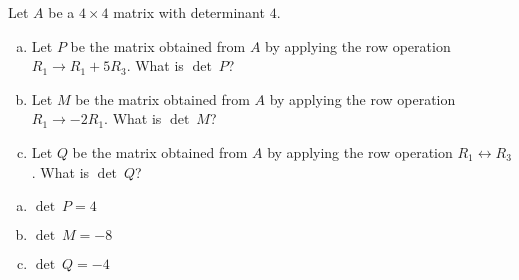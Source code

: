 
\begin{exerciseStatement}


Let \(A\) be a \(4 \times 4\) matrix with determinant \( 4 \).


\begin{enumerate}[(a)]
\item Let \(P\) be the matrix obtained from \(A\) by applying the row operation \( R_1 \to R_1 + 5R_3 \). What is \(\operatorname{det}\ P\)?
\item Let \(M\) be the matrix obtained from \(A\) by applying the row operation \( R_1 \to -2R_1 \). What is \(\operatorname{det}\ M\)?
\item Let \(Q\) be the matrix obtained from \(A\) by applying the row operation \( R_1 \leftrightarrow R_3 \). What is \(\operatorname{det}\ Q\)?
\end{enumerate}
    
\end{exerciseStatement}
    
\begin{exerciseAnswer} 

\begin{enumerate}[(a)]
\item \(\operatorname{det}\ P= 4 \)
\item \(\operatorname{det}\ M= -8 \)
\item \(\operatorname{det}\ Q= -4 \)
\end{enumerate}
    
\end{exerciseAnswer}
    
